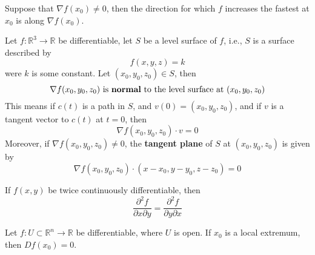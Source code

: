 \documentclass[openany]{book}
\newcommand{\R}{\mathbb{R}}
\begin{document}
\begin{prop}
    Suppose that $\nabla f(x_0)\neq 0$, then the direction for which $f$ increases the fastest at $x_0$ is along $\nabla f(x_0)$.
\end{prop}


\begin{prop}\label{tangent plane}
    Let $f:\R^3\to\R$ be differentiable, let $S$ be a level surface of $f$, i.e., $S$ is a surface described by 
    \begin{equation*}
        f(x,y,z)=k
    \end{equation*}
    were $k$ is some constant. Let $(x_0,y_0,z_0)\in S$, then
    \begin{equation*}
        \nabla f(x_0,y_0,z_0) \text{ is \textbf{normal} to the level surface at } (x_0,y_0,z_0)
    \end{equation*}
    This means if $c(t)$ is a path in $S$, and $v(0)=(x_0,y_0,z_0)$, and if $v$ is a tangent vector to $c(t)$ at $t=0$, then 
    \begin{equation*}
        \nabla f(x_0,y_0, z_0)\cdot v=0
    \end{equation*}
    Moreover, if $\nabla f(x_0,y_0,z_0)\neq 0$, the \textbf{tangent plane} of $S$ at $(x_0,y_0,z_0)$ is given by 
    \begin{equation*}
        \nabla f(x_0,y_0,z_0)\cdot (x-x_0, y-y_0, z-z_0)=0
    \end{equation*}
\end{prop}

\begin{prop}
    If $f(x,y)$ be twice continuously differentiable, then 
    \begin{equation*}
        \frac{\partial^2 f}{\partial x\partial y}=\frac{\partial^2f}{\partial y\partial x}
    \end{equation*}
\end{prop}


\begin{prop}
    Let $f:U\subset\R^n\to\R$ be differentiable, where $U$ is open. If $x_0$ is a local extremum, then $Df(x_0)=0$. 
\end{prop}
\end{document}
